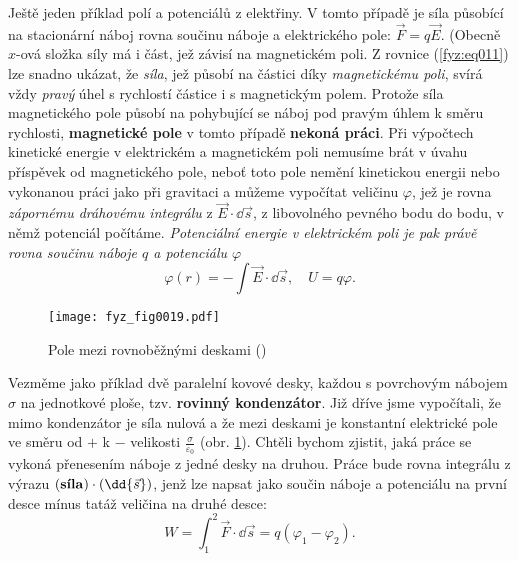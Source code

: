     Ještě jeden příklad polí a potenciálů z elektřiny. V tomto případě je síla působící na 
    stacionární náboj rovna součinu náboje a elektrického pole: \(\vec{F}= q\vec{E}\). (Obecně 
    \(x\)-ová složka síly má i část, jež závisí na magnetickém poli. Z rovnice (\ref{fyz:eq011}) 
    lze snadno ukázat, že \emph{síla}, jež působí na částici díky \emph{magnetickému poli}, svírá 
    vždy \emph{pravý} úhel s rychlostí částice i s magnetickým polem. Protože síla magnetického 
    pole působí na pohybující se náboj pod pravým úhlem k směru rychlosti, \textbf{magnetické pole} 
    v tomto případě \textbf{nekoná práci}. Při výpočtech kinetické energie v elektrickém a 
    magnetickém poli nemusíme brát v úvahu příspěvek od magnetického pole, neboť toto pole nemění 
    kinetickou energii nebo vykonanou práci jako při gravitaci a můžeme vypočítat veličinu 
    \(\varphi\), jež je rovna \emph{zápornému dráhovému integrálu} z \(\vec{E}\cdot\dd{\vec{s}}\), 
    z libovolného pevného bodu do bodu, v němž potenciál počítáme. \emph{Potenciální energie v 
    elektrickém poli je pak právě rovna součinu náboje \(q\) a potenciálu \(\varphi\)}
    \begin{equation}\label{fyz:eq012}
      \varphi(r) = -\int\vec{E}\cdot\dd{\vec{s}}, \quad U = q\varphi.
    \end{equation}
    
    \begin{figure}[ht!]  %
      \centering
      \texttt{[image: fyz\_fig0019.pdf]}
      \caption{Pole mezi rovnoběžnými deskami (\cite[s.~207]{Feynman01})}
      \label{fyz:fig0019}
    \end{figure}   
    Vezměme jako příklad dvě paralelní kovové desky, každou s povrchovým nábojem \(\sigma\) na 
    jednotkové ploše, tzv. \textbf{rovinný kondenzátor}. Již dříve jsme vypočítali, že mimo 
    kondenzátor je síla nulová a že mezi deskami je konstantní elektrické pole ve směru od \(+\) k 
    \(-\) velikosti \(\frac{\sigma}{\varepsilon_0}\) (obr. \ref{fyz:fig0019}). Chtěli bychom 
    zjistit, jaká práce se vykoná přenesením náboje z jedné desky na druhou. Práce bude rovna 
    integrálu z výrazu \((\text{\textbf{síla}})\cdot(\dd{\vec{s}})\), jenž lze napsat jako součin 
    náboje a potenciálu na první desce mínus tatáž veličina na druhé desce:
    \begin{equation}\label{fyz:eq013}
      W = \int_1^2\vec{F}\cdot\dd{\vec{s}} = q(\varphi_1 -\varphi_2).
    \end{equation}

